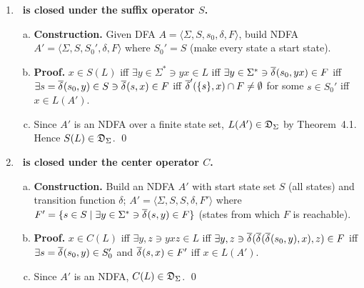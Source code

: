 \begin{enumerate}[{5.}1. ]
\begin{proof}
\emph{Claim:} $L(A')=P(L)$.

$x\in P(L)$ iff $\exists y\in\Sigma^*\ni xy\in L$
iff $\exists y\in\Sigma^*\ni\deltabar{}(s_0,xy)\in F$
iff $\exists y\in\Sigma^*\ni\deltabar{}(\deltabar{}(s_0,x),y)\in F$
iff $\deltabar{}(s_0,x)\in F'$
iff $x\in L(A')$.

Since $F'$ is computable (for each state $s$, check if any state in $F$ is reachable from $s$---a finite graph problem), $A'$ is a valid DFA and $P(L)=L(A')\in\DSIG$. \qed
\end{proof}

\item \textbf{\DSIG\ is closed under the suffix operator $S$.}

\begin{enumerate}[(a)]
  \item \textbf{Construction.}  Given DFA $A=\langle\Sigma,S,s_0,\delta,F\rangle$,
  build NDFA $A'=\langle\Sigma,S,S_0',\delta,F\rangle$ where
  $S_0'=S$ (make every state a start state).

  \item \textbf{Proof.}  $x\in S(L)$ iff $\exists y\in\Sigma^*\ni yx\in L$
  iff $\exists y\in\Sigma^*\ni\overline{\delta^{}}(s_0,yx)\in F$
  iff $\exists s=\overline{\delta^{}}(s_0,y)\in S\ni\overline{\delta^{}}(s,x)\in F$
  iff $\overline{\delta}'(\{s\},x)\cap F\neq\emptyset$ for some $s\in S_0'$
  iff $x\in L(A')$.

  \item Since $A'$ is an NDFA over a finite state set, $L(A')\in\mathfrak{D}_\Sigma$ by Theorem~4.1.  Hence $S(L)\in\mathfrak{D}_\Sigma$. \qed
\end{enumerate}

\item \textbf{\DSIG\ is closed under the center operator $C$.}

\begin{enumerate}[(a)]
  \item \textbf{Construction.}  Build an NDFA $A'$ with start state set $S$ (all states)
  and transition function $\delta$; $A'=\langle\Sigma,S,S,\delta,F'\rangle$ where
  $F'=\{s\in S\mid\exists y\in\Sigma^*\ni\overline{\delta^{}}(s,y)\in F\}$ (states from which $F$ is reachable).

  \item \textbf{Proof.}  $x\in C(L)$ iff $\exists y,z\ni yxz\in L$
  iff $\exists y,z\ni\overline{\delta^{}}(\overline{\delta^{}}(\overline{\delta^{}}(s_0,y),x),z)\in F$
  iff $\exists s=\overline{\delta^{}}(s_0,y)\in S_0'$ and $\overline{\delta^{}}(s,x)\in F'$
  iff $x\in L(A')$.

  \item Since $A'$ is an NDFA, $C(L)\in\mathfrak{D}_\Sigma$. \qed
\end{enumerate}


\end{enumerate}
